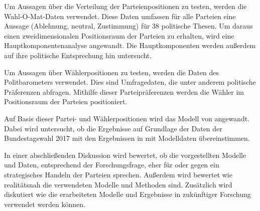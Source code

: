 Um Aussagen über die Verteilung der Parteienpositionen zu testen, werden die Wahl-O-Mat-Daten \citep{WahlOMat} verwendet.
Diese Daten umfassen für alle Parteien eine Aussage (Ablehnung, neutral, Zustimmung) für 38 politische Thesen.
Um daraus einen zweidimensionalen Positionsraum der Parteien zu erhalten, wird eine Hauptkomponentenanalyse angewandt.
Die Hauptkomponenten werden außerdem auf ihre politische Entsprechung hin untersucht.

Um Aussagen über Wählerpositionen zu testen, werden die Daten des Politbarometers \citep{politbarometer} verwendet.
Dies sind Umfragedaten, die unter anderem politische Präferenzen abfragen.
Mithilfe dieser Parteipräferenzen werden die Wähler im Positionsraum der Parteien positioniert.

Auf Basis dieser Partei- und Wählerpositionen wird das Modell von \citet{laver2005policy} angewandt.
Dabei wird untersucht, ob die Ergebnisse auf Grundlage der Daten der Bundestagswahl 2017 mit den Ergebnissen in \citet{laver2005policy} mit Modelldaten übereinstimmen.

In einer abschließenden Diskussion wird bewertet, ob die vorgestellten Modelle und Daten, entsprechend der Forschungsfrage, eher für oder gegen ein strategisches Handeln der Parteien sprechen.
Außerdem wird bewertet wie realitätsnah die verwendeten Modelle und Methoden sind.
Zusätzlich wird diskutiert wie die erarbeiteten Modelle und Ergebnisse in zukünftiger Forschung verwendet werden können.
